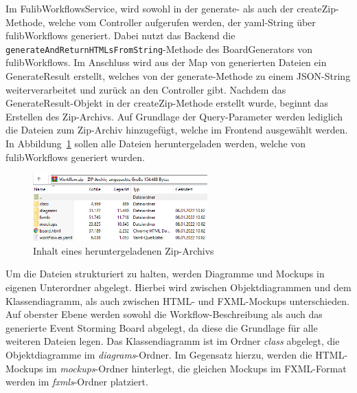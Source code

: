 Im FulibWorkflowsService, wird sowohl in der generate- als auch der createZip-Methode, welche vom Controller aufgerufen werden,
der yaml-String über fulibWorkflows generiert.
Dabei nutzt das Backend die \texttt{generateAndReturnHTMLsFromString}-Methode des BoardGenerators von fulibWorkflows.
Im Anschluss wird aus der Map von generierten Dateien ein GenerateResult erstellt, welches von der generate-Methode zu einem JSON-String weiterverarbeitet und zurück an den Controller gibt.
Nachdem das GenerateResult-Objekt in der createZip-Methode erstellt wurde, beginnt das Erstellen des Zip-Archivs.
Auf Grundlage der Query-Parameter werden lediglich die Dateien zum Zip-Archiv hinzugefügt, welche im Frontend ausgewählt werden.
In Abbildung~\ref{fig:export} sollen alle Dateien heruntergeladen werden, welche von fulibWorkflows generiert wurden.

\begin{figure}[h]
    \centering
    \includegraphics[width=0.6\textwidth]{images/3.3/export}
    \caption{Inhalt eines heruntergeladenen Zip-Archivs}
    \label{fig:export}
\end{figure}

Um die Dateien strukturiert zu halten, werden Diagramme und Mockups in eigenen Unterordner abgelegt.
Hierbei wird zwischen Objektdiagrammen und dem Klassendiagramm, als auch zwischen HTML- und FXML-Mockups unterschieden.
Auf oberster Ebene werden sowohl die Workflow-Beschreibung als auch das generierte Event Storming Board abgelegt, da diese
die Grundlage für alle weiteren Dateien legen.
Das Klassendiagramm ist im Ordner \textit{class} abgelegt, die Objektdiagramme im \textit{diagrams}-Ordner.
Im Gegensatz hierzu, werden die HTML-Mockups im \textit{mockups}-Ordner hinterlegt, die gleichen Mockups im FXML-Format werden
im \textit{fxmls}-Ordner platziert.
